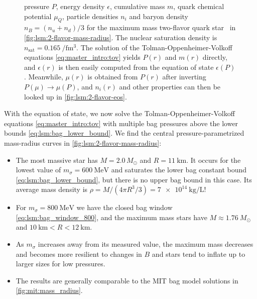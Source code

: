 \begin{figure}[p]
{	pressure $P$,
	energy density $\epsilon$,
	cumulative mass $m$,
	quark chemical potential $\mu_Q$,
	particle densities $n_i$
	and baryon density $n_B = (n_u+n_d)/3$
	for the maximum mass two-flavor quark star \goldenstar in \cref{fig:lsm:2-flavor-mass-radius}.
	The nuclear saturation density is $n_\text{sat} = \SI{0.165}{\per\femto\meter\cubed}$.
	The solution of the Tolman-Oppenheimer-Volkoff equations \eqref{eq:master_intro:tov} yields $P(r)$ and $m(r)$ directly,
	and $\epsilon(r)$ is then easily computed from the equation of state $\epsilon(P)$.
	Meanwhile, $\mu(r)$ is obtained from $P(r)$ after inverting $P(\mu) \rightarrow \mu(P)$,
	and $n_i(r)$ and other properties can then be looked up in \cref{fig:lsm:2-flavor-eos}.
}
\end{figure}

With the equation of state, we now solve the Tolman-Oppenheimer-Volkoff equations \eqref{eq:master_intro:tov} with multiple bag pressures above the lower bounds \eqref{eq:lsm:bag_lower_bound}.
We find the central pressure-parametrized mass-radius curves in \cref{fig:lsm:2-flavor-mass-radius}:
\begin{itemize}
\item The most massive star has $M = 2.0 \, M_\odot$ and $R = \SI{11}{\kilo\meter}$.
      It occurs for the lowest value of $m_\sigma=\SI{600}{\mega\electronvolt}$ and saturates the lower bag constant bound \eqref{eq:lsm:bag_lower_bound}, but there is no upper bag bound in this case.
      Its average mass density is $\rho = M / (4 \pi R^3/3) = \SI{7e14}{\kilo\gram\per\liter}$!
\item For $m_\sigma = \SI{800}{\mega\electronvolt}$ we have the closed bag window \eqref{eq:lsm:bag_window_800},
      and the maximum mass stars have $M \approx \SI{1.76}{} M_\odot$ and $\SI{10}{\kilo\meter} < R < \SI{12}{\kilo\meter}$.
\item As $m_\sigma$ increases away from its measured value,
      the maximum mass decreases and becomes more resilient to changes in $B$ and stars tend to inflate up to larger sizes for low pressures.
\item The results are generally comparable to the MIT bag model solutions in \cref{fig:mit:mass_radius}.
\end{itemize}

